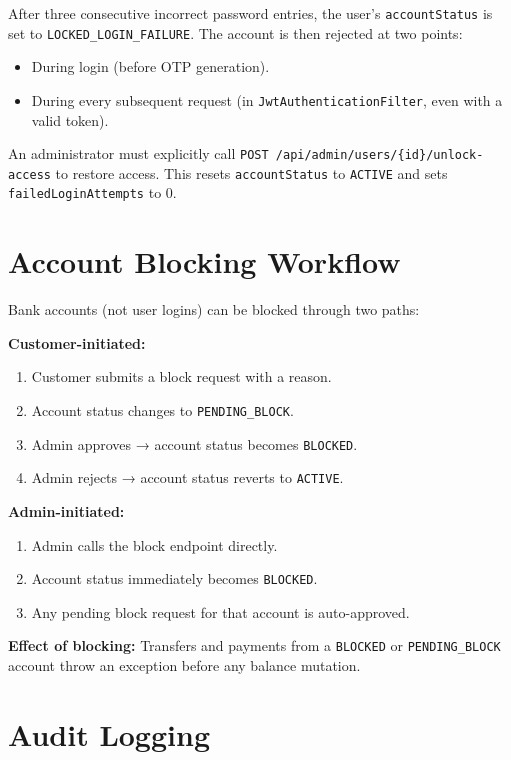 \documentclass[12pt,a4paper]{report}
\begin{document}
After three consecutive incorrect password entries, the user's \texttt{accountStatus}
is set to \texttt{LOCKED\_LOGIN\_FAILURE}. The account is then rejected at two points:
\begin{itemize}[noitemsep]
  \item During login (before OTP generation).
  \item During every subsequent request (in \texttt{JwtAuthenticationFilter}, even
        with a valid token).
\end{itemize}

An administrator must explicitly call \texttt{POST /api/admin/users/\{id\}/unlock-access}
to restore access. This resets \texttt{accountStatus} to \texttt{ACTIVE} and sets
\texttt{failedLoginAttempts} to 0.

\section{Account Blocking Workflow}

Bank accounts (not user logins) can be blocked through two paths:

\textbf{Customer-initiated:}
\begin{enumerate}[noitemsep]
  \item Customer submits a block request with a reason.
  \item Account status changes to \texttt{PENDING\_BLOCK}.
  \item Admin approves → account status becomes \texttt{BLOCKED}.
  \item Admin rejects → account status reverts to \texttt{ACTIVE}.
\end{enumerate}

\textbf{Admin-initiated:}
\begin{enumerate}[noitemsep]
  \item Admin calls the block endpoint directly.
  \item Account status immediately becomes \texttt{BLOCKED}.
  \item Any pending block request for that account is auto-approved.
\end{enumerate}

\textbf{Effect of blocking:} Transfers and payments from a \texttt{BLOCKED} or
\texttt{PENDING\_BLOCK} account throw an exception before any balance mutation.

\section{Audit Logging}
\end{document}
